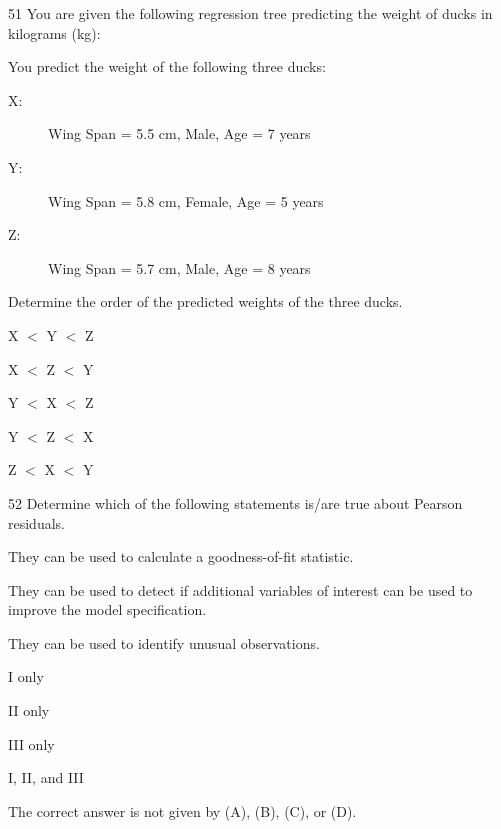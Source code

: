 \begin{question}{51}
You are given the following regression tree predicting the weight of ducks in kilograms (kg):


You predict the weight of the following three ducks:
\begin{description}
\item[X:] Wing Span = 5.5 cm, Male, Age = 7 years
\item[Y:] Wing Span = 5.8 cm, Female, Age = 5 years
\item[Z:] Wing Span = 5.7 cm, Male, Age = 8 years
\end{description}

Determine the order of the predicted weights of the three ducks.

\begin{choices}
\item X $<$ Y $<$ Z
\item X $<$ Z $<$ Y
\item Y $<$ X $<$ Z
\item Y $<$ Z $<$ X
\item Z $<$ X $<$ Y
\end{choices}
\end{question}

\begin{question}{52}
Determine which of the following statements is/are true about Pearson residuals.

\begin{statements}
\item They can be used to calculate a goodness-of-fit statistic.
\item They can be used to detect if additional variables of interest can be used to improve the model specification.
\item They can be used to identify unusual observations.
\end{statements}

\begin{choices}
\item I only
\item II only
\item III only
\item I, II, and III
\item The correct answer is not given by (A), (B), (C), or (D).
\end{choices}
\end{question}


